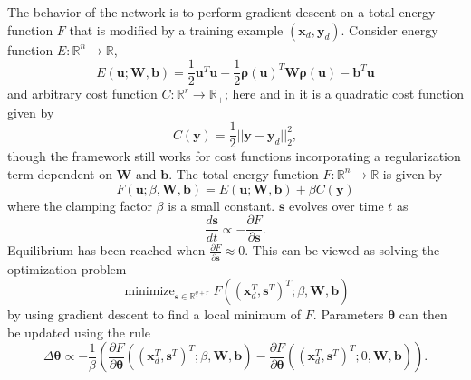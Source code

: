 \documentclass[utf8]{frontiersSCNS}
\newcommand{\mtx}[1]{\mathbf{#1}}
\DeclareMathOperator*{\minimize}{minimize}
\begin{document}
The behavior of the network is to perform gradient descent on a total energy function $F$ that is modified by a training example $(\mtx{x}_d,\mtx{y}_d)$. Consider energy function $E:\mathbb{R}^n\to\mathbb{R}$,
\begin{equation}
E(\mtx{u}; \mtx{W}, \mtx{b})=\frac{1}{2}\mtx{u}^T\mtx{u}-\frac{1}{2}\mtx{\rho}(\mtx{u})^T \mtx{W} \mtx{\rho}(\mtx{u})-\mtx{b}^T\mtx{u} \label{eqn:energy}
\end{equation}
and arbitrary cost function $C:\mathbb{R}^r\to\mathbb{R}_{+}$; here and in \citep{scellier17} it is a quadratic cost function given by
\begin{equation}
C(\mtx{y})=\frac{1}{2}||\mtx{y}-\mtx{y}_d||_2^2, \label{eqn:cost}
\end{equation}
though the framework still works for cost functions incorporating a regularization term dependent on $\mtx{W}$ and $\mtx{b}$. The total energy function $F:\mathbb{R}^n\to\mathbb{R}$ is given by
\begin{equation}
F(\mtx{u}; \beta, \mtx{W}, \mtx{b})=E(\mtx{u};\mtx{W}, \mtx{b})+\beta C(\mtx{y}) \label{eqn:total_energy}
\end{equation}
where the clamping factor $\beta$ is a small constant. $\mtx{s}$ evolves over time $t$ as
\begin{equation}
\frac{d\mtx{s}}{dt}\propto -\frac{\partial F}{\partial \mtx{s}}. \label{eqn:dynamics}
\end{equation}
Equilibrium has been reached when $\frac{\partial F}{\partial \mtx{s}} \approx 0$. This can be viewed as solving the optimization problem
\begin{equation}
\minimize_{\mtx{s}\in\mathbb{R}^{q+r}}F((\mtx{x}_d^T,\mtx{s}^T)^T; \beta, \mtx{W}, \mtx{b}) 
\end{equation}
by using gradient descent to find a local minimum of $F$. Parameters $\mtx{\theta}$ can then be updated using the rule 
\begin{equation}
\Delta \mtx{\theta} \propto -\frac{1}{\beta}(\frac{\partial F}{\partial \mtx{\theta}}((\mtx{x}_d^T, \mtx{s}^T)^T; \beta, \mtx{W}, \mtx{b})-\frac{\partial F}{\partial \mtx{\theta}}((\mtx{x}_d^T, \mtx{s}^T)^T; 0, \mtx{W}, \mtx{b})).
\end{equation}
\end{document}
